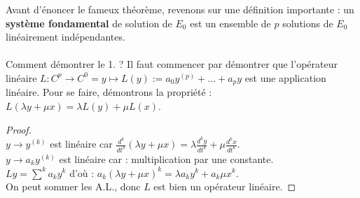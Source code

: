 \documentclass[11pt, a4paper, openany]{book}
\begin{document}
Avant d'énoncer le fameux théorème, revenons sur une définition importante : un \textbf{système fondamental} de solution de $E_0$ est un ensemble de $p$ solutions de $E_0$ linéairement indépendantes.\\
	
\ \\
Comment démontrer le 1. ? Il faut commencer par démontrer que l'opérateur linéaire $L : C^p \rightarrow C^0 = y \mapsto L(y) := a_0y^{(p)} + \dots + a_p y$ est une application linéaire. Pour se faire, démontrons la propriété : $L(\lambda y + \mu x) = \lambda L(y) + \mu L(x)$.
		
\begin{proof}\ \\
	$y \rightarrow y^{(k)}$ est linéaire car $\frac{d^k}{dt^k}(\lambda y + \mu x) = \lambda\frac{d^k y}{dt^k} + \mu \frac{d^kx}{dt^k}$.\\
	$y \rightarrow a_ky^{(k)}$ est linéaire car : multiplication par une constante.\\
	$Ly = \sum^k a_k y^k$ d'où : $a_k(\lambda y + \mu x)^k = \lambda a_k y^k + a_k \mu x^k$.\\
	On peut sommer les A.L., donc $L$ est bien un opérateur linéaire.
\end{proof}
		
\end{document}
